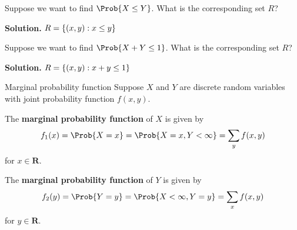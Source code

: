 \begin{Example}{}{}
    Suppose we want to find $ \Prob{X\le Y} $. What is the
    corresponding set $ R $?

    \textbf{Solution.} $ R=\{(x,y):x\le y\} $

    Suppose we want to find $ \Prob{X+Y\le 1} $. What is the corresponding
    set $ R $?

    \textbf{Solution.} $ R=\{(x,y):x+y\le 1\} $
\end{Example}

\begin{Definition}{Marginal probability function}{}
    Suppose $ X $ and $ Y $ are discrete
    random variables with joint probability
    function $ f(x,y) $.

    The \textbf{marginal probability
        function} of $ X $ is given by
    \[ f_1(x)=\Prob{X=x}
        =\Prob{X=x,Y<\infty}
        =\sum\limits_{y}f(x,y)  \]
    for $ x\in\mathbf{R} $.

    The \textbf{marginal probability function} of $ Y $
    is given by
    \[ f_2(y)=\Prob{Y=y}
        =\Prob{X<\infty,Y=y}
        =\sum\limits_{x}f(x,y)  \]
    for $ y\in\mathbf{R} $.
\end{Definition}

